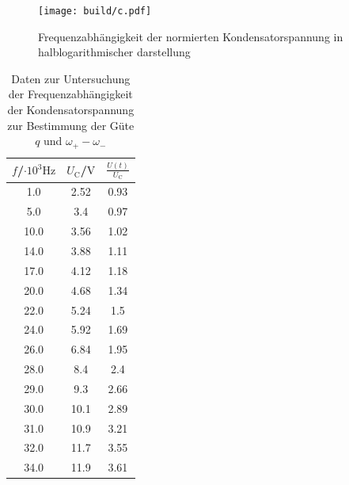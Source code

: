 \begin{figure}
	\centering
	\texttt{[image: build/c.pdf]}
	\caption{Frequenzabhängigkeit der normierten Kondensatorspannung in halblogarithmischer darstellung}
	\label{fig:q}
\end{figure}
\begin{table}
	\caption{Daten zur Untersuchung der Frequenzabhängigkeit der Kondensatorspannung zur Bestimmung der Güte $q$ und $\omega_+ - \omega_- $}
	\label{tab:Kuh}
	\centering
	\begin{tabular}{ccc}
		\toprule
		$f$/$\cdot 10^{3} \si{\Hz}$ & $U_\text{C}$/$\si{\volt}$ & $\frac{U(t)}{U_\text{C}}$ \\
		\midrule
		1.0                         & 2.52                      & 0.93                      \\
		5.0                         & 3.4                       & 0.97                      \\
		10.0                        & 3.56                      & 1.02                      \\
		14.0                        & 3.88                      & 1.11                      \\
		17.0                        & 4.12                      & 1.18                      \\
		20.0                        & 4.68                      & 1.34                      \\
		22.0                        & 5.24                      & 1.5                       \\
		24.0                        & 5.92                      & 1.69                      \\
		26.0                        & 6.84                      & 1.95                      \\
		28.0                        & 8.4                       & 2.4                       \\
		29.0                        & 9.3                       & 2.66                      \\
		30.0                        & 10.1                      & 2.89                      \\
		31.0                        & 10.9                      & 3.21                      \\
		32.0                        & 11.7                      & 3.55                      \\
		34.0                        & 11.9                      & 3.61                      \\

\end{tabular}
\end{table}
